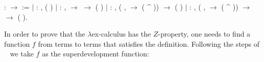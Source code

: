 \documentclass{llncs}
\begin{document}
  \begin{coqdoccode}
\coqdocemptyline
\coqdocnoindent
{}  :  \ensuremath{\rightarrow}  :=\coqdoceol
\coqdocindent{1.00em}
\ensuremath{|}  : \coqdockw{\ensuremath{\forall}} ,\coqdoceol
\coqdocindent{3.00em}
 ( )\coqdoceol
\coqdocindent{1.00em}
\ensuremath{|}  : \coqdockw{\ensuremath{\forall}}  ,\coqdoceol
\coqdocindent{3.00em}
  \ensuremath{\rightarrow} \coqdoceol
\coqdocindent{3.00em}
  \ensuremath{\rightarrow} \coqdoceol
\coqdocindent{3.00em}
 (  )\coqdoceol
\coqdocindent{1.00em}
\ensuremath{|}  : \coqdockw{\ensuremath{\forall}}  ,\coqdoceol
\coqdocindent{3.00em}
(\coqdockw{\ensuremath{\forall}} ,    \ensuremath{\rightarrow}  ( \^{} )) \ensuremath{\rightarrow}\coqdoceol
\coqdocindent{3.00em}
 ( )\coqdoceol
\coqdocindent{1.00em}
\ensuremath{|}  : \coqdockw{\ensuremath{\forall}}   ,\coqdoceol
\coqdocindent{2.50em}
(\coqdockw{\ensuremath{\forall}} ,    \ensuremath{\rightarrow}  ( \^{} )) \ensuremath{\rightarrow}\coqdoceol
\coqdocindent{3.00em}
  \ensuremath{\rightarrow} \coqdoceol
\coqdocindent{3.00em}
 (  ).\coqdoceol
\end{coqdoccode}

In order to prove that the $\lambda$ex-calculus has the $Z$-property, one needs to find a function $f$ from terms to terms that satisfies the definition. Following the steps of ~\cite{kes09} we take $f$ as the superdevelopment function:
\end{document}
